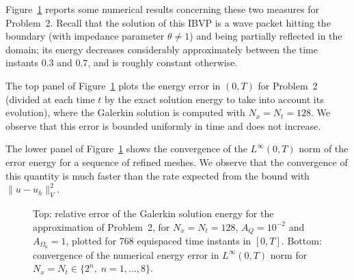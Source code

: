 \documentclass[a4paper]{article}
\theoremstyle{plain}
\theoremstyle{definition}
\newcommand{\OZ}{{\Omega_0}}
\newcommand{\logLogSlopeTriangle}[5]
{
    \pgfplotsextra
    {
        \pgfkeysgetvalue{/pgfplots/xmin}{\xmin}
        \pgfkeysgetvalue{/pgfplots/xmax}{\xmax}
        \pgfkeysgetvalue{/pgfplots/ymin}{\ymin}
        \pgfkeysgetvalue{/pgfplots/ymax}{\ymax}

        \pgfmathsetmacro{\xArel}{#1}
        \pgfmathsetmacro{\yArel}{#3}
        \pgfmathsetmacro{\xBrel}{#1-#2}
        \pgfmathsetmacro{\yBrel}{\yArel}
        \pgfmathsetmacro{\xCrel}{\xArel}

        \pgfmathsetmacro{\lnxB}{\xmin*(1-(#1-#2))+\xmax*(#1-#2)}
        \pgfmathsetmacro{\lnxA}{\xmin*(1-#1)+\xmax*#1}
        \pgfmathsetmacro{\lnyA}{\ymin*(1-#3)+\ymax*#3}
        \pgfmathsetmacro{\lnyC}{\lnyA+#4*(\lnxA-\lnxB)}
        \pgfmathsetmacro{\yCrel}{\lnyC-\ymin)/(\ymax-\ymin)}

        \coordinate (A) at (rel axis cs:\xArel,\yArel);
        \coordinate (B) at (rel axis cs:\xBrel,\yBrel);
        \coordinate (C) at (rel axis cs:\xCrel,\yCrel);

        \draw[#5]   (A)-- node[pos=0.5,anchor=north] {1}
        (B)--
        (C)-- node[pos=0.5,anchor=west] {#4}
        cycle;
    }
}
\begin{document}
Figure~\ref{fig:EnergyError} reports some numerical results concerning these two measures for Problem~2.
Recall that the solution of this IBVP is a wave packet hitting the boundary (with impedance parameter $\theta\ne1$) and being partially reflected in the domain; its energy decreases considerably approximately between the time instants $0.3$ and $0.7$, and is roughly constant otherwise.

The top panel of Figure~\ref{fig:EnergyError} plots the energy error in $(0,T)$ for Problem~2 (divided at each time $t$ by the exact solution energy to take into account its evolution), where the Galerkin solution is computed with $N_x=N_t=128$.
We observe that this error is bounded uniformly in time and does not increase.

The lower panel of Figure~\ref{fig:EnergyError} shows the convergence of the $L^\infty(0,T)$ norm of the error energy
for a sequence of refined meshes.
We observe that the convergence of this quantity is much faster than the rate expected from the bound with $\|u-u_h\|_V^2$.


\begin{figure}[htb]
\centering
\caption{Top: relative error of the Galerkin solution energy for the approximation of Problem~2,  for $N_x = N_t = 128$, $A_Q=10^{-2}$ and $A_\OZ=1$, plotted for $768$ equispaced time instants in $[0,T]$.
Bottom: convergence of the numerical energy error in $L^\infty(0, T)$ norm for $N_x=N_t\in\{2^n,\; n=1,\ldots,8\}$.}
\label{fig:EnergyError}
\end{figure}
\end{document}
